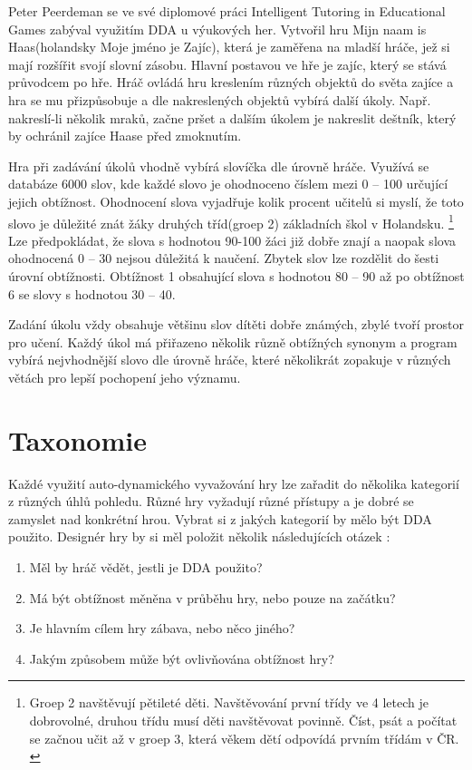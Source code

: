 Peter Peerdeman se ve své diplomové práci Intelligent Tutoring in Educational Games\cite{14Haas} zabýval využitím DDA u výukových her. Vytvořil hru Mijn naam is Haas(holandsky Moje jméno je Zajíc), která je zaměřena na mladší hráče, jež si mají rozšířit svojí slovní zásobu. Hlavní postavou ve hře je zajíc, který se stává průvodcem po hře. Hráč ovládá hru kreslením různých objektů do světa zajíce a hra se mu přizpůsobuje a dle nakreslených objektů vybírá další úkoly. Např. nakreslí-li několik mraků, začne pršet a dalším úkolem je nakreslit deštník, který by ochránil zajíce Haase před zmoknutím.

Hra při zadávání úkolů vhodně vybírá slovíčka dle úrovně hráče. Využívá se databáze 6000 slov, kde každé slovo je ohodnoceno číslem mezi 0 – 100 určující jejich obtížnost. Ohodnocení slova vyjadřuje kolik procent učitelů si myslí, že toto slovo je důležité znát žáky druhých tříd(groep  2)  základních škol v Holandsku. \footnote{Groep 2 navštěvují pětileté děti. Navštěvování první třídy ve 4 letech je dobrovolné, druhou třídu musí děti navštěvovat povinně. Číst, psát a počítat se začnou učit až v groep 3, která věkem dětí odpovídá prvním třídám v ČR. \cite{27EdHolland}} Lze předpokládat, že slova s hodnotou 90-100 žáci již dobře znají a naopak slova ohodnocená 0 – 30 nejsou důležitá k naučení. Zbytek slov lze rozdělit do šesti úrovní obtížnosti. Obtížnost 1 obsahující slova s hodnotou 80 – 90 až po obtížnost 6 se slovy s hodnotou 30 – 40.

Zadání úkolu vždy obsahuje většinu slov dítěti dobře známých, zbylé tvoří prostor pro učení. Každý úkol má přiřazeno několik různě obtížných synonym a program vybírá nejvhodnější slovo dle úrovně hráče, které několikrát zopakuje v různých větách pro lepší pochopení jeho významu.

\section{Taxonomie}

Každé využití auto-dynamického vyvažování hry lze zařadit do několika kategorií z různých úhlů pohledu. Různé hry vyžadují různé přístupy a je dobré se zamyslet nad konkrétní hrou. Vybrat si z jakých kategorií by mělo být DDA použito. Designér hry by si měl položit několik následujících otázek :


\begin{enumerate}
	\item Měl by hráč vědět, jestli je DDA použito?
	\item Má být obtížnost měněna v průběhu hry, nebo pouze na začátku?
	\item Je hlavním cílem hry zábava, nebo něco jiného?
	\item Jakým způsobem může být ovlivňována obtížnost hry?
\end{enumerate}

